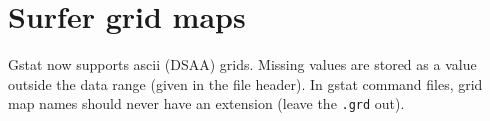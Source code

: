 \documentclass[a4paper,12pt]{book}
\newif\ifpdf
\begin{document}
\section{Surfer grid maps}

Gstat now supports
 ascii (DSAA)
grids. Missing values are stored as a value outside the data range (given
in the file header). In gstat command files, grid map names should never
have an extension (leave the {\tt .grd} out).

\ifpdf
\newpage
\pdfbookmark[0]{Bibliography}{bibliography}
\fi





\ifpdf
\newpage
\pdfbookmark[0]{Index}{index}
\fi


\printindex
\end{document}
